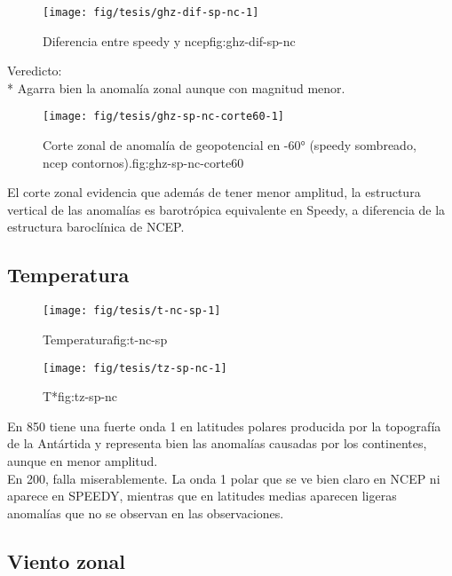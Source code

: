 \documentclass[spanish,a4paper]{book}
\begin{document}
\begin{figure}

{\centering \texttt{[image: fig/tesis/ghz-dif-sp-nc-1]} 

}

\caption{Diferencia entre speedy y ncep{fig:ghz-dif-sp-nc}}\label{fig:ghz-dif-sp-nc}
\end{figure}

Veredicto:\\
* Agarra bien la anomalía zonal aunque con magnitud menor.

\begin{figure}

{\centering \texttt{[image: fig/tesis/ghz-sp-nc-corte60-1]} 

}

\caption{Corte zonal de anomalía de geopotencial en -60° (speedy sombreado, ncep contornos).{fig:ghz-sp-nc-corte60}}\label{fig:ghz-sp-nc-corte60}
\end{figure}

El corte zonal evidencia que además de tener menor amplitud, la
estructura vertical de las anomalías es barotrópica equivalente en
Speedy, a diferencia de la estructura baroclínica de NCEP.

\subsection{Temperatura}\label{temperatura-1}

\begin{figure}
\texttt{[image: fig/tesis/t-nc-sp-1]} \caption{Temperatura{fig:t-nc-sp}}\label{fig:t-nc-sp}
\end{figure}

\begin{figure}
\texttt{[image: fig/tesis/tz-sp-nc-1]} \caption{T*{fig:tz-sp-nc}}\label{fig:tz-sp-nc}
\end{figure}

En 850 tiene una fuerte onda 1 en latitudes polares producida por la
topografía de la Antártida y representa bien las anomalías causadas por
los continentes, aunque en menor amplitud.\\
En 200, falla miserablemente. La onda 1 polar que se ve bien claro en
NCEP ni aparece en SPEEDY, mientras que en latitudes medias aparecen
ligeras anomalías que no se observan en las observaciones.

\subsection{Viento zonal}\label{viento-zonal-1}
\end{document}
